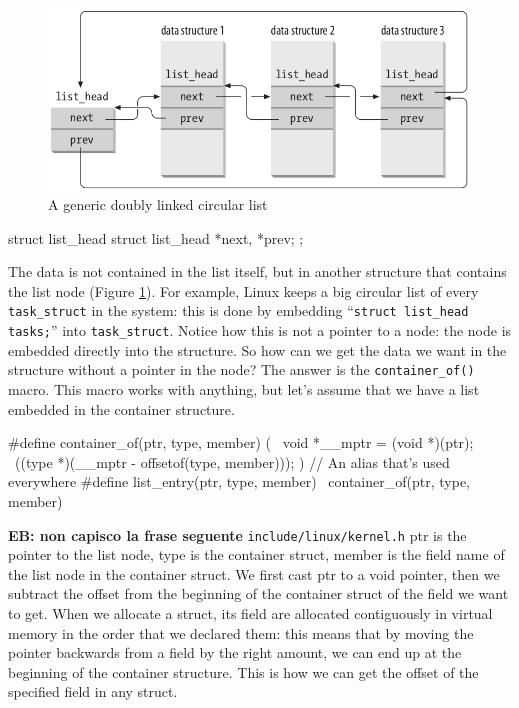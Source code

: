 \documentclass[10pt, oneside]{book}
\newcommand{\mycomment}[1]{\textbf{#1}}  %
\begin{document}
\begin{figure}[ht]
\includegraphics[width=\textwidth]{images/list.png}
\caption{A generic doubly linked circular list}
\label{img:list}
\end{figure}

\begin{code}
struct list_head {
  struct list_head *next, *prev;
};
\end{code}
The data is not contained in the list itself, but in another structure that contains the list node (Figure \ref{img:list}). For example, Linux keeps a big circular list of every \verb|task_struct| in the system: this is done by embedding ``\verb|struct list_head tasks;|'' into \verb|task_struct|. Notice how this is not a pointer to a node: the node is embedded directly into the structure. So how can we get the data we want in the structure without a pointer in the node? The answer is the \verb|container_of()| macro. This macro works with anything, but let's assume that we have a list embedded in the container structure.
\begin{code}
#define container_of(ptr, type, member) ({ \
  void *__mptr = (void *)(ptr); \
  ((type *)(__mptr - offsetof(type, member))); })
// An alias that's used everywhere
#define list_entry(ptr, type, member) \
        container_of(ptr, type, member)
\end{code}
\mycomment{EB: non capisco la frase seguente}
\verb|include/linux/kernel.h|
ptr is the pointer to the list node, type is the container struct, member is the field name of the list node in the container struct. We first cast ptr to a void pointer, then we subtract the offset from the beginning of the container struct of the field we want to get. When we allocate a struct, its field are allocated contiguously in virtual memory in the order that we declared them: this means that by moving the pointer backwards from a field by the right amount, we can end up at the beginning of the container structure. This is how we can get the offset of the specified field in any struct. 
\end{document}
